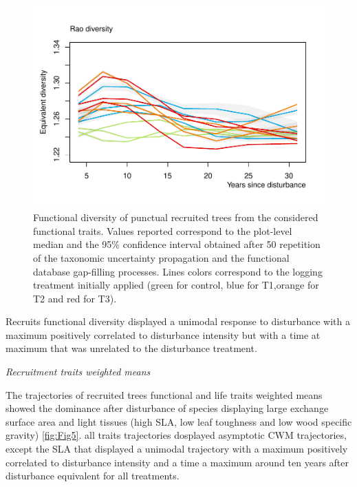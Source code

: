 \documentclass[fleqn,10pt]{ArtEcoFoG} %
\begin{document}
\begin{figure}

{\centering \includegraphics[width=0.5\linewidth]{RecruitmentTrajectories_files/figure-latex/Fig4-1} 

}

\caption{Functional diversity of punctual recruited trees from the considered functional traits. Values reported correspond to the plot-level median and the 95\% confidence interval obtained after 50 repetition of the taxonomic uncertainty propagation and the functional database gap-filling processes. Lines colors correspond to the logging treatment initially applied (green for control, blue for T1,orange for T2 and red for T3).}\label{fig:Fig4}
\end{figure}

Recruits functional diversity displayed a unimodal response to
disturbance with a maximum positively correlated to disturbance
intensity but with a time at maximum that was unrelated to the
disturbance treatment.

\emph{Recruitment traits weighted means}

The trajectories of recruited trees functional and life traits weighted
means showed the dominance after disturbance of species displaying large
exchange surface area and light tissues (high SLA, low leaf toughness
and low wood specific gravity) \ref{fig:Fig5}. all traits trajectories
dosplayed asymptotic CWM trajectories, except the SLA that displayed a
unimodal trajectory with a maximum positively correlated to disturbance
intensity and a time a maximum around ten years after disturbance
equivalent for all treatments.
\end{document}
